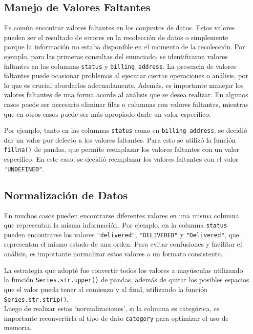 \subsection{Manejo de Valores Faltantes}

Es común encontrar valores faltantes en los conjuntos de datos. Estos valores pueden ser el resultado de errores en la recolección de datos o simplemente porque la información no estaba disponible en el momento de la recolección. Por ejemplo, para las primeras consultas del enunciado, se identificaron valores faltantes en las columnas \texttt{status} y \texttt{billing\_address}.
La presencia de valores faltantes puede ocasionar problemas al ejecutar ciertas operaciones o análisis, por lo que es crucial abordarlos adecuadamente.
Además, es importante manejar los valores faltantes de una forma acorde al análisis que se desea realizar. En algunos casos puede ser necesario eliminar filas o columnas con valores faltantes, mientras que en otros casos puede ser más apropiado darle un valor específico.

Por ejemplo, tanto en las columnas \texttt{status} como en \texttt{billing\_address}, se decidió dar un valor por defecto a los valores faltantes. Para esto se utilizó la función \texttt{fillna()} de pandas, que permite reemplazar los valores faltantes con un valor específico. En este caso, se decidió reemplazar los valores faltantes con el valor \texttt{"UNDEFINED"}.

\subsection{Normalización de Datos}

En muchos casos pueden encontrarse diferentes valores en una misma columna que representan la misma información. Por ejemplo, en la columna \texttt{status} pueden encontrarse los valores \texttt{"delivered"}, \texttt{"DELIVERED"} y \texttt{"Delivered"}, que representan el mismo estado de una orden. Para evitar confusiones y facilitar el análisis, es importante normalizar estos valores a un formato consistente.

La estrategia que adopté fue convertir todos los valores a mayúsculas utilizando la función \texttt{Series.str.upper()} de pandas, además de quitar los posibles espacios que el valor pueda tener al comienzo y al final, utilizando la función \texttt{Series.str.strip()}. \\
Luego de realizar estas `normalizaciones', si la columna es categórica, es importante reconvertirla al tipo de dato \texttt{category} para optimizar el uso de memoria.